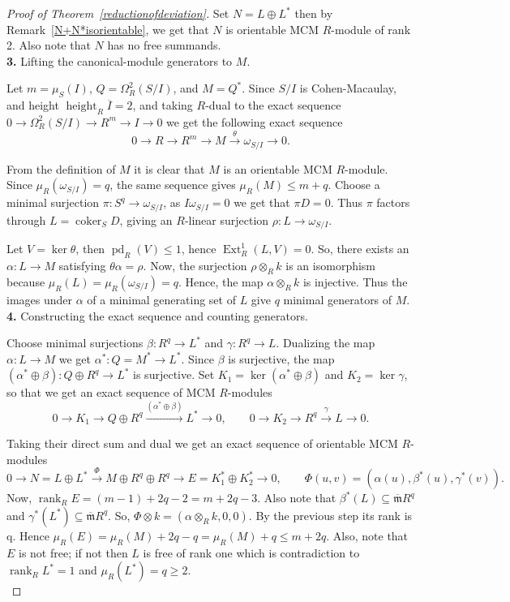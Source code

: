 \documentclass[11pt,letterpaper]{amsart}
\newcommand{\x}{\xrightarrow{}}
\DeclareMathOperator{\Ext}{Ext}
\DeclareMathOperator{\coker}{coker}
\DeclareMathOperator{\rank}{rank}
\DeclareMathOperator{\height}{height}
\theoremstyle{plain}
\theoremstyle{definition}
\theoremstyle{remark}
\begin{document}
\begin{proof}[Proof of Theorem~\ref{reductionofdeviation}]
  Set $N=L\oplus L^*$ then by Remark~\ref{N+N*isorientable}, we get that $N$ is orientable MCM $R$-module of rank 2. Also note that $N$ has no free summands.\\ 

\noindent\textbf{3.}  Lifting the canonical-module generators to $M$.

Let $m=\mu_S(I)$, $Q=\Omega_R^2(S/I)$, and $M=Q^*$. Since $S/I$ is Cohen-Macaulay, and height $\height_R \overline{I}=2$, and taking $R$-dual to the exact sequence $0\x \Omega^2_R(S/I)\x R^m\x I\x 0$ we get the following exact sequence 
\[
0\x R\x R^m\x M
\xrightarrow{\theta}\omega_{S/I}\x0.
\]

From the definition of $M$ it is clear that $M$ is an orientable MCM $R$-module.   Since $\mu_R(\omega_{S/I})=q$, the same sequence gives $\mu_R(M)\le m+q$. Choose a minimal surjection $\pi:S^q\to\omega_{S/I}$, as  $I\omega_{S/I}=0$ we get that $\pi D=0$. Thus $\pi$ factors through $L=\coker_S D$, giving an $R$-linear surjection $\rho:L\to\omega_{S/I}$.

Let $V=\ker\theta$, then $\operatorname{pd}_R(V)\le 1$, hence $\Ext^1_R(L,V)=0$. So, there exists an $\alpha:L\to M$ satisfying $\theta\alpha=\rho$. Now, the surjection $\rho\otimes_R k$ is an isomorphism because $\mu_R(L)=\mu_R(\omega_{S/I})=q$. Hence, the map $\alpha\otimes_R k$ is injective. Thus the images under $\alpha$ of a minimal generating set of $L$ give $q$ minimal generators of $M$.\\

\noindent\textbf{4.} Constructing the exact sequence and counting generators.

Choose minimal surjections $\beta:R^q\to L^*$ and $\gamma:R^q\to L$. Dualizing the map $\alpha:L\to M$ we get  $\alpha^*:Q=M^*\to L^*$. Since $\beta$ is surjective, the map $(\alpha^*\oplus\beta):Q\oplus R^q\to L^*$ is surjective. Set $K_1=\ker(\alpha^*\oplus\beta)$ and $K_2=\ker\gamma$, so that we get an exact sequence of MCM $R$-modules
\[
0\longrightarrow K_1\longrightarrow Q\oplus R^q
\xrightarrow{(\alpha^*\oplus\beta)}L^*\longrightarrow0,
\qquad
0\longrightarrow K_2\longrightarrow R^q
\xrightarrow{\gamma}L\longrightarrow0.
\]

Taking their direct sum and dual we get an exact sequence of orientable MCM $R$-modules
\[
0\x N=L\oplus L^*
\xrightarrow{\Phi}M\oplus R^q\oplus R^q
\x E=K_1^*\oplus K_2^*\x0,
\qquad
\Phi(u,v)=(\alpha(u),\beta^*(u),\gamma^*(v)).
\]
Now, $\rank_R E
=(m-1)+2q-2=m+2q-3$. Also note that $\beta^*(L)\subseteq\overline{\mathfrak m}R^q$ and $\gamma^*(L^*)\subseteq\overline{\mathfrak m}R^q$. So, $\Phi\otimes k=(\alpha\otimes_R k,0,0)$. By the previous step its rank is q. Hence $
\mu_R(E)=\mu_R(M)+2q-q
=\mu_R(M)+q\leq m+2q$. Also, note that 
$E$ is not free; if not then $L$ is free of rank one which is contradiction to $\rank_R L^*=1$ and $\mu_R(L^*)=q\ge 2$.\\


\end{proof}
\end{document}
